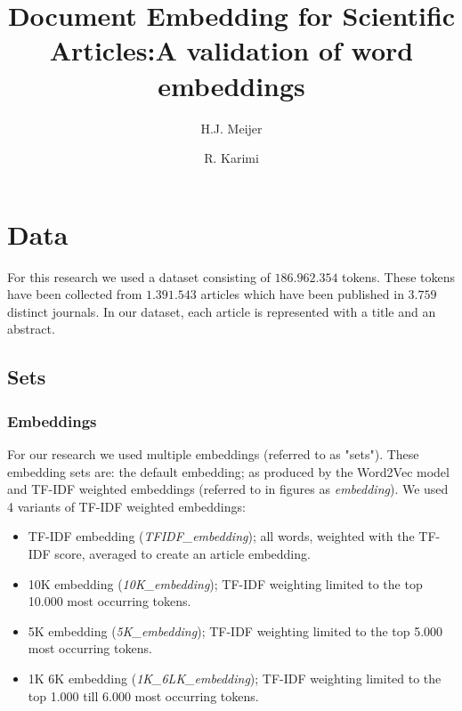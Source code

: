 \documentclass[runningheads]{llncs}
\begin{document}
\title{Document Embedding for Scientific Articles:\newline A validation of word embeddings}

\author{H.J. Meijer \and
R. Karimi}

\maketitle

\begin{abstract}


\end{abstract}
\section{Data}
For this research we used a dataset consisting of $186.962.354$ tokens. These tokens have been collected from $1.391.543$ articles which have been published in $3.759$ distinct journals. In our dataset, each article is represented with a title and an abstract.
\subsection{Sets}
\subsubsection{Embeddings}
For our research we used multiple embeddings (referred to as "sets"). These embedding sets are: the default embedding; as produced by the Word2Vec model and TF-IDF weighted embeddings (referred to in figures as \textit{embedding}). We used 4 variants of TF-IDF weighted embeddings: 
\begin{itemize}
\item{TF-IDF embedding (\textit{TFIDF\_embedding}); all words, weighted with the TF-IDF score, averaged to create an article embedding.}
\item{10K embedding (\textit{10K\_embedding}); TF-IDF weighting limited to the top 10.000 most occurring tokens.}
\item{5K embedding (\textit{5K\_embedding}); TF-IDF weighting limited to the top 5.000 most occurring tokens.}
\item{1K 6K embedding (\textit{1K\_6LK\_embedding}); TF-IDF weighting limited to the top 1.000 till 6.000 most occurring tokens.}
\end{itemize}
\end{document}
